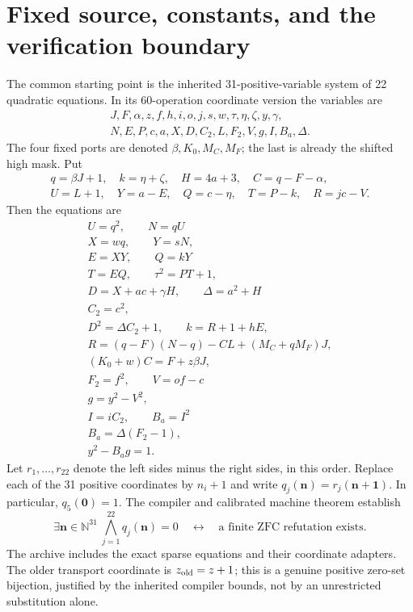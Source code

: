 \documentclass[11pt]{article}
\newcommand{\N}{\mathbb N}
\begin{document}
\section{Fixed source, constants, and the verification boundary}

The common starting point is the inherited 31-positive-variable system of
22 quadratic equations. In its 60-operation coordinate version the variables
are
\[
\begin{gathered}
J,F,\alpha,z,f,h,i,o,j,s,w,\tau,\eta,\zeta,y,\gamma,\\
N,E,P,c,a,X,D,C_2,L,F_2,V,g,I,B_a,\Delta.
\end{gathered}
\]
The four fixed ports are denoted $\beta,K_0,M_C,M_F$; the last is already the
shifted high mask. Put
\[
\begin{gathered}
q=\beta J+1,\quad k=\eta+\zeta,\quad H=4a+3,\quad C=q-F-\alpha,\\
U=L+1,\quad Y=a-E,\quad Q=c-\eta,\quad T=P-k,\quad R=jc-V.
\end{gathered}
\]
Then the equations are
\[\begin{gathered}
U=q^2,\qquad N=qU\\
X=wq,\qquad Y=sN,\\
E=XY,\qquad Q=kY\\
T=EQ,\qquad \tau^2=PT+1,\\
D=X+ac+\gamma H,\qquad \Delta=a^2+H\\
C_2=c^2,\\
D^2=\Delta C_2+1,\qquad k=R+1+hE,\\
R=(q-F)(N-q)-CL+(M_C+qM_F)J,\\
(K_0+w)C=F+z\beta J,\\
F_2=f^2,\qquad V=of-c\\
g=y^2-V^2,\\
I=iC_2,\qquad B_a=I^2\\
B_a=\Delta(F_2-1),\\
y^2-B_ag=1.
\end{gathered}\]
Let $r_1,\ldots,r_{22}$ denote the left sides minus the right sides, in
this order. Replace each of the 31 positive coordinates by $n_i+1$ and
write $q_j(\mathbf n)=r_j(\mathbf n+\mathbf1)$. In particular,
$q_5(\mathbf0)=1$. The compiler and calibrated machine theorem establish
\begin{equation}\label{eq:source}
 \exists\mathbf n\in\N^{31}\ \bigwedge_{j=1}^{22}q_j(\mathbf n)=0
 \quad\longleftrightarrow\quad
 \text{a finite ZFC refutation exists}.
\end{equation}
The archive includes the exact sparse equations and their coordinate adapters.
The older transport coordinate is $z_{\rm old}=z+1$; this is a genuine positive
zero-set bijection, justified by the inherited compiler bounds, not by an
unrestricted substitution alone.
\end{document}
